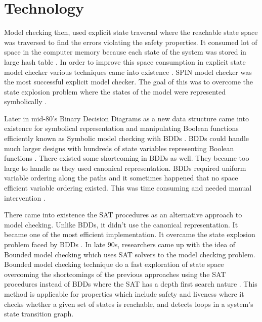 \documentclass[a4paper,12pt]{report}
\begin{document}
\section{Technology}
\label{tech}

Model checking then, used explicit state traversal where the reachable state space was traversed to find the errors violating the safety properties. It consumed lot of space in the computer memory because each state of the system was stored in large hash table \cite{KenmcmiI.Mironov2006}. In order to improve this space consumption in explicit state model checker various techniques came into existence \cite{McMillan1992}. SPIN model checker was the most successful explicit model checker. The goal of this was to overcome the state explosion problem where the states of the model were represented symbolically \cite{McMillan1992}.

Later in mid-80's Binary Decision Diagrams as a new data structure came into existence for symbolical representation and manipulating Boolean functions efficiently known as Symbolic model checking with BDDs \cite{B.Berard2001}. BDDs could handle much larger designs with hundreds of state variables representing Boolean functions \cite{ErichGamma1995}. There existed some shortcoming in BDDs as well. They became too large to handle as they used canonical representation. BDDs required uniform variable ordering along the paths and it sometimes happened that no space efficient variable ordering existed. This was time consuming and needed manual intervention \cite{McMillan1992}.

There came into existence the SAT procedures as an alternative approach to model checking. Unlike BDDs, it didn’t use the canonical representation. It became one of the most efficient implementation. It overcame the state explosion problem faced by BDDs \cite{McMillan1992}. 
In late 90s, researchers came up with the idea of Bounded model checking which uses SAT solvers to the model checking problem. Bounded model checking technique do a fast exploration of state space overcoming the shortcomings of the previous approaches using the SAT procedures instead of BDDs where the SAT has a depth first search nature \cite{McMillan1992}. This method is applicable for properties which include safety and liveness where it checks whether a given set of states is reachable, and detects loops in a system’s state transition graph.
\end{document}
